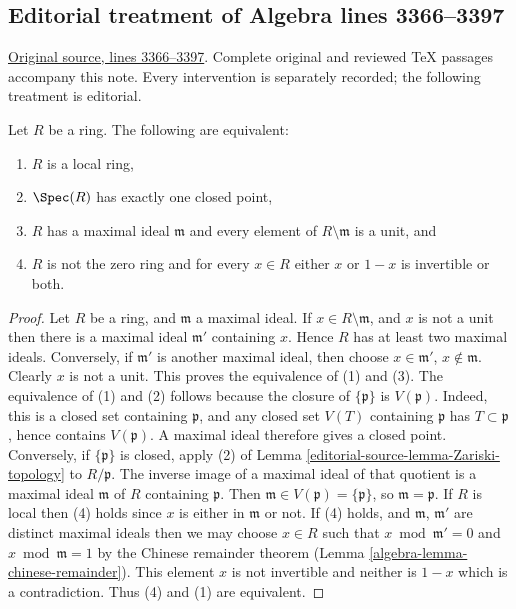 \subsection{Editorial treatment of Algebra lines 3366--3397}

\hypertarget{algebra-context-014}{}

\noindent\href{https://github.com/stacks/stacks-project/blob/a04446e57ec1fbc252a871afcec7752fb2807b14/algebra.tex\#L3366}{Original source, lines 3366--3397}. Complete original and reviewed TeX passages accompany this note. Every intervention is separately recorded; the following treatment is editorial.


\begin{lemma}
\label{editorial-source-lemma-characterize-local-ring}
Let $R$ be a ring. The following are equivalent:
\begin{enumerate}
\item $R$ is a local ring,
\item $\Spec(R)$ has exactly one closed point,
\item $R$ has a maximal ideal $\mathfrak m$
and every element of $R \setminus \mathfrak m$
is a unit, and
\item $R$ is not the zero ring and for every $x \in R$ either $x$
or $1 - x$ is invertible or both.
\end{enumerate}
\end{lemma}

\begin{proof}
Let $R$ be a ring, and $\mathfrak m$ a maximal ideal.
If $x \in R \setminus \mathfrak m$, and $x$ is not a unit
then there is a maximal ideal $\mathfrak m'$ containing $x$.
Hence $R$ has at least two maximal ideals. Conversely,
if $\mathfrak m'$ is another maximal ideal, then choose
$x \in \mathfrak m'$, $x \not \in \mathfrak m$. Clearly
$x$ is not a unit. This proves the equivalence of (1) and (3).
The equivalence of (1) and (2) follows because the closure of $\{\mathfrak p\}$ is
$V(\mathfrak p)$. Indeed, this is a closed set containing
$\mathfrak p$, and any closed set $V(T)$ containing $\mathfrak p$
has $T\subset\mathfrak p$, hence contains $V(\mathfrak p)$.
A maximal ideal therefore gives a closed point. Conversely, if
$\{\mathfrak p\}$ is closed, apply (2) of
Lemma \ref{editorial-source-lemma-Zariski-topology} to $R/\mathfrak p$.
The inverse image of a maximal ideal of that quotient is a maximal
ideal $\mathfrak m$ of $R$ containing $\mathfrak p$.
Then $\mathfrak m\in V(\mathfrak p)=\{\mathfrak p\}$,
so $\mathfrak m=\mathfrak p$.
If $R$ is local then (4) holds since $x$ is either in $\mathfrak m$
or not. If (4) holds, and $\mathfrak m$, $\mathfrak m'$ are distinct
maximal ideals then we may choose $x \in R$ such that
$x \bmod \mathfrak m' = 0$ and $x \bmod \mathfrak m = 1$
by the Chinese remainder theorem
(Lemma \ref{algebra-lemma-chinese-remainder}).
This element $x$ is not invertible and neither is $1 - x$ which is
a contradiction. Thus (4) and (1) are equivalent.
\end{proof}



